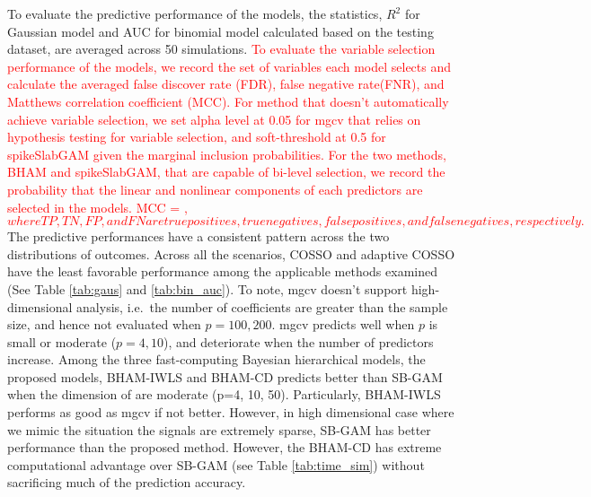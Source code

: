 \documentclass[AMA,STIX1COL,]{WileyNJD-v2}
\begin{document}
To evaluate the predictive performance of the models, the statistics,
\(R^2\) for Gaussian model and AUC for binomial model calculated based
on the testing dataset, are averaged across 50 simulations.
\textcolor{red}{To evaluate the variable selection performance of the models, we record the set of variables each model selects and calculate the averaged false discover rate (FDR), false negative rate(FNR), and Matthews correlation coefficient (MCC). For method that doesn't automatically achieve variable selection, we set alpha level at 0.05 for mgcv that relies on hypothesis testing for variable selection, and soft-threshold at 0.5 for spikeSlabGAM given the marginal inclusion probabilities. For the two methods, BHAM and spikeSlabGAM, that are capable of bi-level selection, we record the probability that the linear and nonlinear components of each predictors are selected in the models.
MCC = ,
$$
where TP, TN, FP, and FN are true positives, true negatives, false positives, and false negatives, respectively.
$$
} The predictive performances have a consistent pattern across the two
distributions of outcomes. Across all the scenarios, COSSO and adaptive
COSSO have the least favorable performance among the applicable methods
examined (See Table \ref{tab:gaus} and \ref{tab:bin_auc}). To note, mgcv
doesn't support high-dimensional analysis, i.e.~the number of
coefficients are greater than the sample size, and hence not evaluated
when \(p=100, 200\). mgcv predicts well when \(p\) is small or moderate
(\(p = 4, 10\)), and deteriorate when the number of predictors increase.
Among the three fast-computing Bayesian hierarchical models, the
proposed models, BHAM-IWLS and BHAM-CD predicts better than SB-GAM when
the dimension of are moderate (p=4, 10, 50). Particularly, BHAM-IWLS
performs as good as mgcv if not better. However, in high dimensional
case where we mimic the situation the signals are extremely sparse,
SB-GAM has better performance than the proposed method. However, the
BHAM-CD has extreme computational advantage over SB-GAM (see Table
\ref{tab:time_sim}) without sacrificing much of the prediction accuracy.

\textcolor{red}{

}
\end{document}
